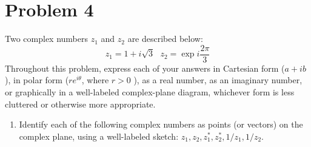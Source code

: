 \documentclass[10pt]{article}
\begin{document}
	\section*{Problem 4}
	Two complex numbers \( z_1 \) and \( z_2 \) are described below:
	\[
		z_1 = 1 + i\sqrt{3} \ \ \ z_2 = \exp{i \frac{2\pi}{3}}
	\] 
	Throughout this problem, express each of your answers in Cartesian form (\( a + ib \)), in polar form 
	(\( re^{i \theta} \), where \( r > 0 \) ), as a real number, as an imaginary number, or graphically in a 
	well-labeled complex-plane diagram, whichever form is less cluttered or otherwise more appropriate. 
	\begin{enumerate}[label=\alph*)]
		\item Identify each of the following complex numbers as points (or vectors) on the complex plane, using a 
			well-labeled sketch: \( z_1, z_2, z_1^*, z_2^*, 1 / z_1, 1/z_2\). 


\end{enumerate}
\end{document}
